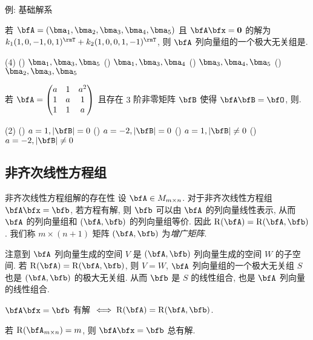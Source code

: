 \begin{frame}{例: 基础解系}
	\onslide<+->
	\begin{example}
		若 $\bfA=(\bma_1,\bma_2,\bma_3,\bma_4,\bma_5)$ 且 $\bfA\bfx={\bf0}$ 的解为 $k_1(1,0,-1,0,1)^\rmT+k_2(1,0,0,1,-1)^\rmT$, 则 $\bfA$ 列向量组的一个极大无关组是.
		\begin{exchoice}(4)
			() $\bma_1,\bma_3,\bma_5$
			() $\bma_1,\bma_3,\bma_4$
			() $\bma_3,\bma_4,\bma_5$
			() $\bma_2,\bma_3,\bma_5$
		\end{exchoice}
	\end{example}
	\onslide<+->
	\begin{exercise}
		若 $\bfA=\begin{pmatrix}
			a&1&a^2\\
			1&a&1\\
			1&1&a
		\end{pmatrix}$ 且存在 $3$ 阶非零矩阵 $\bfB$ 使得 $\bfA\bfB=\bfO$, 则.
		\begin{exchoice}(2)
			() $a=1,|\bfB|=0$
			() $a=-2,|\bfB|=0$
			() $a=1,|\bfB|\neq0$
			() $a=-2,|\bfB|\neq0$
		\end{exchoice}
	\end{exercise}
\end{frame}


\subsection{非齐次线性方程组}

\begin{frame}{非齐次线性方程组解的存在性}
	\onslide<+->
	设 $\bfA\in M_{m\times n}$.
	\onslide<+->
	对于非齐次线性方程组 $\bfA\bfx=\bfb$,
	\onslide<+->
	若方程有解, 则 $\bfb$ 可以由 $\bfA$ 的列向量线性表示, 从而 $\bfA$ 的列向量组和 $(\bfA,\bfb)$ 的列向量组等价.
	\onslide<+->
	因此 $\rank(\bfA)=\rank(\bfA,\bfb)$.
	\onslide<+->
	我们称 $m\times(n+1)$ 矩阵 $(\bfA,\bfb)$ 为\emph{增广矩阵}.

	\onslide<+->
	注意到 $\bfA$ 列向量生成的空间 $V$ 是 $(\bfA,\bfb)$ 列向量生成的空间 $W$ 的子空间.
	\onslide<+->
	若 $\rank(\bfA)=\rank(\bfA,\bfb)$, 则 $V=W$, $\bfA$ 列向量组的一个极大无关组 $S$ 也是 $(\bfA,\bfb)$ 的极大无关组.
	\onslide<+->
	从而 $\bfb$ 是 $S$ 的线性组合, 也是 $\bfA$ 列向量的线性组合.

	\onslide<+->
	\begin{theorem}
		$\bfA \bfx=\bfb$ 有解 $\iff \rank(\bfA)=\rank(\bfA,\bfb)$.
	\end{theorem}
	\onslide<+->
	\begin{corollary}
		若 $\rank(\bfA_{m\times n})=m$, 则 $\bfA \bfx=\bfb$ 总有解.
	\end{corollary}
\end{frame}


